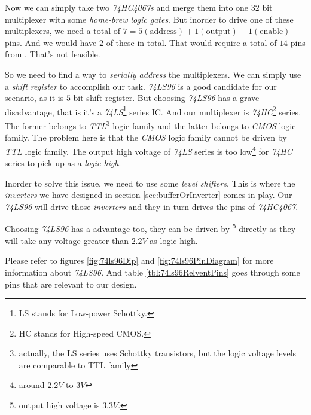 \documentclass[../../main]{subfiles}
\begin{document}
Now we can simply take two \emph{74HC4067s} and merge them into one $32$ bit multiplexer with
some \emph{home-brew logic gates}. But inorder to drive one of these multiplexers, we need
a total of $7 = 5 (\mbox{address}) + 1 (\mbox{output}) + 1 (\mbox{enable})$ pins. And we would
have $2$ of these in total. That would require a total of $14$ pins from \esp. That's not
feasible.

So we need to find a way to \emph{serially address} the multiplexers. We can simply use a
\emph{shift register} to accomplish our task. \emph{74LS96} is a good candidate for our
scenario, as it is $5$ bit shift register. But choosing \emph{74LS96} has a grave disadvantage,
that is it's a \emph{74LS}\footnote{LS stands for Low-power Schottky.} series IC.
And our multiplexer is \emph{74HC}\footnote{HC stands for High-speed CMOS.} series. The former
belongs to \emph{TTL}\footnote{actually, the LS series uses Schottky transistors, but the
logic voltage levels are comparable to TTL family} logic family and the latter belongs to
\emph{CMOS} logic family. The problem here is that the \emph{CMOS} logic family cannot be driven
by \emph{TTL} logic family. The output high voltage of \emph{74LS} series is too low\footnote{around
$2.2\si{V}$ to $3\si{V}$} for \emph{74HC} series to pick up as a \emph{logic high}.

Inorder to solve this issue, we need to use some \emph{level shifters}. This is where the
\emph{inverters} we have designed in section \ref{sec:bufferOrInverter} comes in play.
Our \emph{74LS96} will drive those \emph{inverters} and they in turn drives the pins of
\emph{74HC4067}.

Choosing \emph{74LS96} has a advantage too, they can be driven by \esp\footnote{output high voltage is
$3.3\si{V}$.} directly as they will take any voltage greater than $2.2\si{V}$ as logic high.

Please refer to figures \ref{fig:74ls96Dip} and \ref{fig:74ls96PinDiagram} for more information about
\emph{74LS96}. And table \ref{tbl:74ls96RelventPins} goes through some pins that are relevant to
our design.


\end{document}
